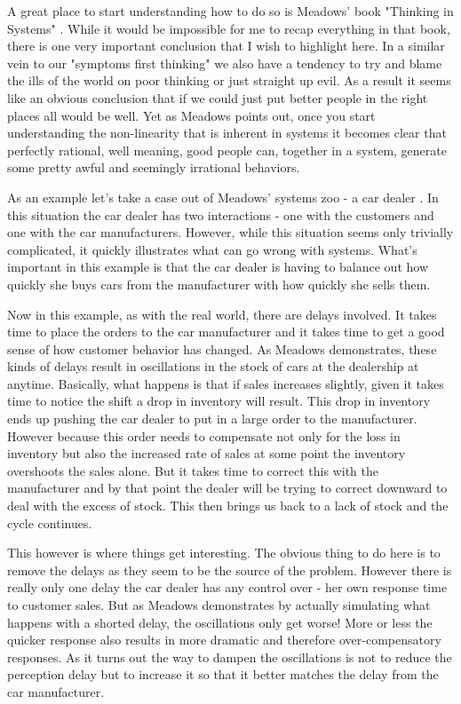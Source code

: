 \documentclass[11pt,a5paper]{book}
\begin{document}
A great place to start understanding how to do so is Meadows' book "Thinking in Systems" \cite{meadows}. While it would be impossible for me to recap everything in that book, there is one very important conclusion that I wish to highlight here. In a similar vein to our "symptoms first thinking" we also have a tendency to try and blame the ills of the world on poor thinking or just straight up evil. As a result it seems like an obvious conclusion that if we could just put better people in the right places all would be well. Yet as Meadows points out, once you start understanding the non-linearity that is inherent in systems it becomes clear that perfectly rational, well meaning, good people can, together in a system, generate some pretty awful and seemingly irrational behaviors. 
\newline 

As an example let's take a case out of Meadows' systems zoo - a car dealer \cite{meadows}. In this situation the car dealer has two interactions - one with the customers and one with the car manufacturers. However, while this situation seems only trivially complicated, it quickly illustrates what can go wrong with systems. What's important in this example is that the car dealer is having to balance out how quickly she buys cars from the manufacturer with how quickly she sells them.
\newline

Now in this example, as with the real world, there are delays involved. It takes time to place the orders to the car manufacturer and it takes time to get a good sense of how customer behavior has changed. As Meadows demonstrates, these kinds of delays result in oscillations in the stock of cars at the dealership at anytime. Basically, what happens is that if sales increases slightly, given it takes time to notice the shift a drop in inventory will result. This drop in inventory ends up pushing the car dealer to put in a large order to the manufacturer. However because this order needs to compensate not only for the loss in inventory but also the increased rate of sales at some point the inventory overshoots the sales alone. But it takes time to correct this with the manufacturer and by that point the dealer will be trying to correct downward to deal with the excess of stock. This then brings us back to a lack of stock and the cycle continues.
\newline

This however is where things get interesting. The obvious thing to do here is to remove the delays as they seem to be the source of the problem. However there is really only one delay the car dealer has any control over - her own response time to customer sales. But as Meadows demonstrates by actually simulating what happens with a shorted delay, the oscillations only get worse! More or less the quicker response also results in more dramatic and therefore over-compensatory responses. As it turns out the way to dampen the oscillations is not to reduce the perception delay but to increase it so that it better matches the delay from the car manufacturer.
\newline
\end{document}
